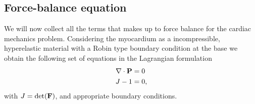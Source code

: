 \subsection{Force-balance equation}
We will now collect all the terms that makes up to force balance for
the cardiac mechanics problem. Considering the myocardium as a incompressible,
hyperelastic material with a Robin type boundary condition at the base
we obtain the following set of equations in the Lagrangian formulation
\begin{align}
  \begin{split}
  \nabla \cdot \mathbf{P} &= 0 \\
  J - 1 &= 0,
  \end{split}
 \label{eq:force_balance_strong}
\end{align}
with $J = \det(\mathbf{F})$, and appropriate boundary conditions.
 


